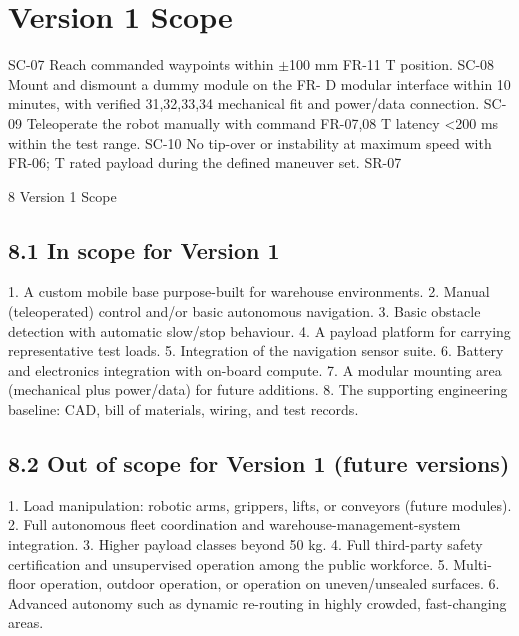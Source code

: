 \chapter{Version 1 Scope}

SC-07      Reach commanded waypoints within $\pm$100 mm                FR-11               T position. SC-08      Mount and dismount a dummy module on the                FR-                 D modular interface within 10 minutes, with verified      31,32,33,34 mechanical fit and power/data connection. SC-09      Teleoperate the robot manually with command             FR-07,08            T latency <200 ms within the test range. SC-10      No tip-over or instability at maximum speed with        FR-06;              T rated payload during the defined maneuver set.          SR-07

8 Version 1 Scope

\section*{8.1 In scope for Version 1}

1. A custom mobile base purpose-built for warehouse environments. 2. Manual (teleoperated) control and/or basic autonomous navigation. 3. Basic obstacle detection with automatic slow/stop behaviour. 4. A payload platform for carrying representative test loads. 5. Integration of the navigation sensor suite. 6. Battery and electronics integration with on-board compute. 7. A modular mounting area (mechanical plus power/data) for future additions. 8. The supporting engineering baseline: CAD, bill of materials, wiring, and test records.

\section*{8.2 Out of scope for Version 1 (future versions)}

1. Load manipulation: robotic arms, grippers, lifts, or conveyors (future modules). 2. Full autonomous fleet coordination and warehouse-management-system integration. 3. Higher payload classes beyond 50 kg. 4. Full third-party safety certification and unsupervised operation among the public workforce. 5. Multi-floor operation, outdoor operation, or operation on uneven/unsealed surfaces. 6. Advanced autonomy such as dynamic re-routing in highly crowded, fast-changing areas.


